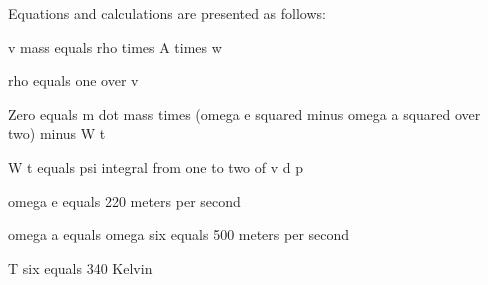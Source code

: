 Equations and calculations are presented as follows:

v mass equals rho times A times w

rho equals one over v

Zero equals m dot mass times (omega e squared minus omega a squared over two) minus W t

W t equals psi integral from one to two of v d p

omega e equals 220 meters per second

omega a equals omega six equals 500 meters per second

T six equals 340 Kelvin